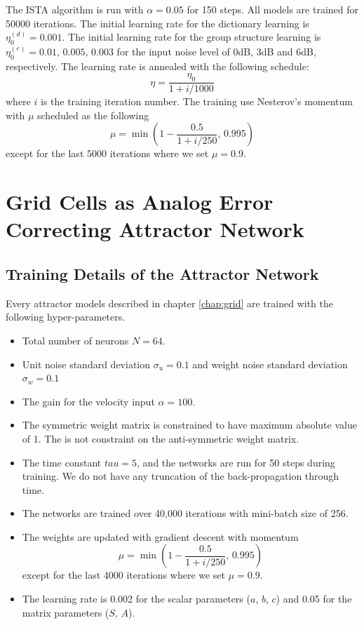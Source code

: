 The ISTA algorithm is run with $\alpha=0.05$ for 150 steps. All models are trained for 50000 iterations. The initial learning rate for the dictionary learning is $\eta_0^{(d)}=0.001$. The initial learning rate for the group structure learning is $\eta_0^{(e)}=0.01,\, 0.005,\, 0.003$ for the input noise level of 0dB, 3dB and 6dB, respectively. The learning rate is annealed with the following schedule:
\begin{equation}
\eta = \frac{\eta_0}{1 + i / 1000} 
\end{equation}
where $i$ is the training iteration number. The training use Nesterov's momentum with $\mu$ scheduled as the following
\begin{equation}
\mu = \min\left(
	1 - \frac{0.5}{1 + i / 250},\, 0.995
	\right)
\end{equation}
except for the last 5000 iterations where we set $\mu = 0.9$.


\chapter{Grid Cells as Analog Error Correcting Attractor Network}
\section{Training Details of the Attractor Network}
Every attractor models described in chapter \ref{chap:grid} are trained with the following hyper-parameters.
\begin{itemize}
\item Total number of neurons $N=64$.
\item Unit noise standard deviation $\sigma_u=0.1$ and weight noise standard deviation $\sigma_w=0.1$
\item The gain for the velocity input $\alpha=100$.
\item The symmetric weight matrix is constrained to have maximum absolute value of 1. The is not constraint on the anti-symmetric weight matrix.
\item The time constant $tau=5$, and the networks are run for 50 steps during training. We do not have any truncation of the back-propagation through time.
\item The networks are trained over 40,000 iterations with mini-batch size of 256.
\item The weights are updated with gradient descent with momentum
\begin{equation}
\mu = \min\left(
	1 - \frac{0.5}{1 + i / 250},\, 0.995
	\right)
\end{equation}
except for the last 4000 iterations where we set $\mu = 0.9$.
\item The learning rate is 0.002 for the scalar parameters ($a$, $b$, $c$) and 0.05 for the matrix parameters ($S$, $A$).
\end{itemize}


